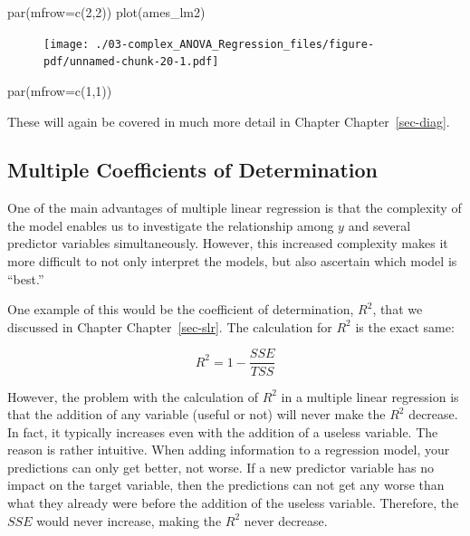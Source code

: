 \documentclass[
  letterpaper,
  DIV=11,
  numbers=noendperiod]{scrreprt}
\newenvironment{Shaded}{\begin{snugshade}}{\end{snugshade}}
\newcommand{\AttributeTok}[1]{\textcolor[rgb]{0.40,0.45,0.13}{#1}}
\newcommand{\DecValTok}[1]{\textcolor[rgb]{0.68,0.00,0.00}{#1}}
\newcommand{\FunctionTok}[1]{\textcolor[rgb]{0.28,0.35,0.67}{#1}}
\newcommand{\NormalTok}[1]{\textcolor[rgb]{0.00,0.23,0.31}{#1}}
\begin{document}
\begin{Shaded}
\begin{Highlighting}[]
\FunctionTok{par}\NormalTok{(}\AttributeTok{mfrow=}\FunctionTok{c}\NormalTok{(}\DecValTok{2}\NormalTok{,}\DecValTok{2}\NormalTok{))}
\FunctionTok{plot}\NormalTok{(ames\_lm2)}
\end{Highlighting}
\end{Shaded}

\begin{figure}[H]

{\centering \texttt{[image: ./03-complex\_ANOVA\_Regression\_files/figure-pdf/unnamed-chunk-20-1.pdf]}

}

\end{figure}

\begin{Shaded}
\begin{Highlighting}[]
\FunctionTok{par}\NormalTok{(}\AttributeTok{mfrow=}\FunctionTok{c}\NormalTok{(}\DecValTok{1}\NormalTok{,}\DecValTok{1}\NormalTok{))}
\end{Highlighting}
\end{Shaded}

These will again be covered in much more detail in Chapter
Chapter~\ref{sec-diag}.

\hypertarget{multiple-coefficients-of-determination}{%
\subsection{Multiple Coefficients of
Determination}\label{multiple-coefficients-of-determination}}

One of the main advantages of multiple linear regression is that the
complexity of the model enables us to investigate the relationship among
\(y\) and several predictor variables simultaneously. However, this
increased complexity makes it more difficult to not only interpret the
models, but also ascertain which model is ``best.''

One example of this would be the coefficient of determination, \(R^2\),
that we discussed in Chapter Chapter~\ref{sec-slr}. The calculation for
\(R^2\) is the exact same:

\[
R^2 = 1 - \frac{SSE}{TSS}
\]

However, the problem with the calculation of \(R^2\) in a multiple
linear regression is that the addition of any variable (useful or not)
will never make the \(R^2\) decrease. In fact, it typically increases
even with the addition of a useless variable. The reason is rather
intuitive. When adding information to a regression model, your
predictions can only get better, not worse. If a new predictor variable
has no impact on the target variable, then the predictions can not get
any worse than what they already were before the addition of the useless
variable. Therefore, the \(SSE\) would never increase, making the
\(R^2\) never decrease.
\end{document}

